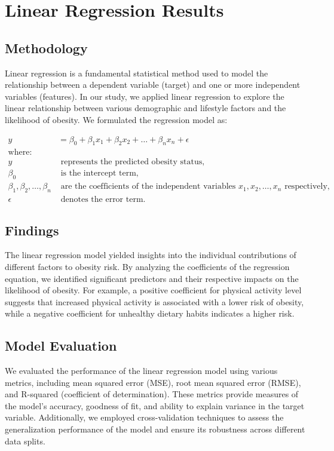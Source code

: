 \documentclass[conference]{IEEEtran}
\begin{document}
\section{Linear Regression Results}

\subsection{Methodology}\label{AA}
Linear regression is a fundamental statistical method used to model the relationship between a dependent variable (target) and one or more independent variables (features). In our study, we applied linear regression to explore the linear relationship between various demographic and lifestyle factors and the likelihood of obesity. We formulated the regression model as:

\begin{align*}
y &= \beta_0 + \beta_1 x_1 + \beta_2 x_2 + \ldots + \beta_n x_n + \epsilon \\
\text{where:} \\
y & \text{ represents the predicted obesity status,} \\
\beta_0 & \text{ is the intercept term,} \\
\beta_1, \beta_2, \ldots, \beta_n & \text{ are the coefficients of the independent variables } x_1, x_2, \ldots, x_n \text{ respectively,} \\
\epsilon & \text{ denotes the error term.}
\end{align*}

\subsection{Findings}\label{AA}
The linear regression model yielded insights into the individual contributions of different factors to obesity risk. By analyzing the coefficients of the regression equation, we identified significant predictors and their respective impacts on the likelihood of obesity. For example, a positive coefficient for physical activity level suggests that increased physical activity is associated with a lower risk of obesity, while a negative coefficient for unhealthy dietary habits indicates a higher risk.

\subsection{Model Evaluation}\label{AA}
We evaluated the performance of the linear regression model using various metrics, including mean squared error (MSE), root mean squared error (RMSE), and R-squared (coefficient of determination). These metrics provide measures of the model's accuracy, goodness of fit, and ability to explain variance in the target variable. Additionally, we employed cross-validation techniques to assess the generalization performance of the model and ensure its robustness across different data splits.
\end{document}
